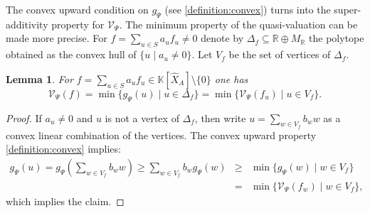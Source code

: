 \documentclass[12pt, a4article]{amsart}   	%
\numberwithin{equation}{section}
\theoremstyle{plain}
\newtheorem{lemma}[theorem]{Lemma}
\theoremstyle{definition}
\newtheorem{remark}[theorem]{Remark}
\begin{document}
The convex upward condition on $g_{\Psi}$ (see \eqref{definition:convex}) turns into the super-additivity property for $\mathcal V_\Psi$. The minimum property of the quasi-valuation can be made more precise. For $f=\sum_{u\in S} a_{u}f_{u}\neq 0$ denote by $\Delta_f\subseteq \mathbb R\oplus M_\mathbb R$ the polytope obtained as the convex hull of $\{u\mid a_{u}\not=0\}$. Let $V_f$ be the set of vertices of $\Delta_f$.

\begin{lemma}\label{lemma:extremal:value}
For $f=\sum_{u\in S} a_u f_{u}\in  \mathbb K[\hat X_A]\setminus\{0\}$ one has
$$\mathcal V_\Psi(f)= \min\{g_\Psi(u)\mid u\in \Delta_f\}= \min\{\mathcal V_\Psi(f_{u})\mid u\in V_f\}.$$
\end{lemma}

\begin{proof}
If $a_u\not=0$ and $u$ is not a vertex of $\Delta_f$, then write $u=\sum_{w\in V_f} b_{w} w$ as a convex linear combination of the vertices.  
The convex upward property \eqref{definition:convex} implies:
$$\begin{array}{rcl}
g_{\Psi}(u)=g_{\Psi}(\sum_{w\in V_f} b_{w} w)
\ge \sum_{w\in V_f} b_{w} g_{\Psi}(w)
&\ge&\min\{g_{\Psi}(w)\mid w\in V_f\}\\
&=&\min\{\mathcal V_\Psi(f_{w})\mid w\in V_f\},
\end{array}$$
which implies the claim.
\end{proof}



\end{document}
